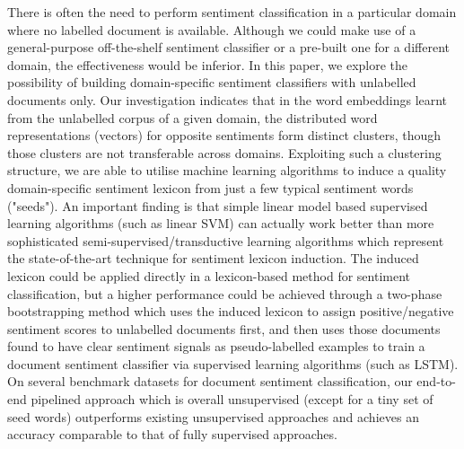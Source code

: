 There is often the need to perform sentiment classification in a particular domain where no labelled document is available. Although we could make use of a general-purpose off-the-shelf sentiment classifier or a pre-built one for a different domain, the effectiveness would be inferior. In this paper, we explore the possibility of building domain-specific sentiment classifiers with unlabelled documents only. Our investigation indicates that in the word embeddings learnt from the unlabelled corpus of a given domain, the distributed word representations (vectors) for opposite sentiments form distinct clusters, though those clusters are not transferable across domains. Exploiting such a clustering structure, we are able to utilise machine learning algorithms to induce a quality domain-specific sentiment lexicon from just a few typical sentiment words ("seeds"). An important finding is that simple linear model based supervised learning algorithms (such as linear SVM) can actually work better than more sophisticated semi-supervised/transductive learning algorithms which represent the state-of-the-art technique for sentiment lexicon induction. The induced lexicon could be applied directly in a lexicon-based method for sentiment classification, but a higher performance could be achieved through a two-phase bootstrapping method which uses the induced lexicon to assign positive/negative sentiment scores to unlabelled documents first, and then uses those documents found to have clear sentiment signals as pseudo-labelled examples to train a document sentiment classifier via supervised learning algorithms (such as LSTM). On several benchmark datasets for document sentiment classification, our end-to-end pipelined approach which is overall unsupervised (except for a tiny set of seed words) outperforms existing unsupervised approaches and achieves an accuracy comparable to that of fully supervised approaches.